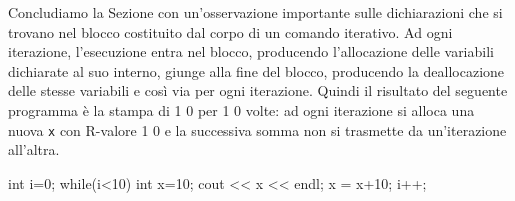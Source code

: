 \documentclass[a4paper,12pt]{book}
\begin{document}
Concludiamo la Sezione con un'osservazione importante sulle dichiarazioni che si trovano nel blocco costituito dal corpo di un comando iterativo.
Ad ogni iterazione, l'esecuzione entra nel blocco, producendo l'allocazione delle variabili dichiarate al suo interno, giunge alla fine del blocco, producendo la deallocazione delle stesse variabili e così via per ogni iterazione.
Quindi il risultato del seguente programma è la stampa di 1 0 per 1 0 volte: ad ogni iterazione si alloca una nuova \texttt{x} con R-valore 1 0 e la successiva somma non si trasmette da un'iterazione all'altra.

\begin{codice}

int i=0;
while(i<10) {
  int x=10;
  cout << x << endl;
  x = x+10;
  i++;
}
\end{codice}
\end{document}
